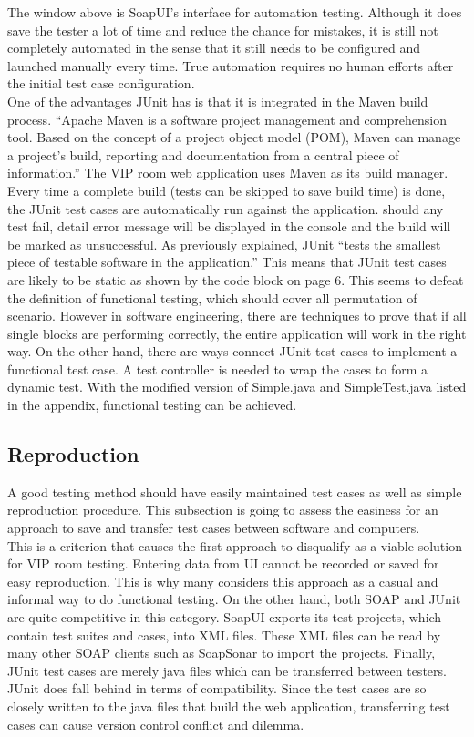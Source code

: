 \documentclass[12pt]{article}
\begin{document}
The window above is SoapUI's interface for automation testing. Although it does save the tester a lot of time and reduce the chance for mistakes, it is still not completely automated in the sense that it still needs to be configured and launched manually every time. True automation requires no human efforts after the initial test case configuration.\\

One of the advantages JUnit has is that it is integrated in the Maven build process. “Apache Maven is a software project management and comprehension tool. Based on the concept of a project object model (POM), Maven can manage a project's build, reporting and documentation from a central piece of information.”\cite{maven} The VIP room web application uses Maven as its build manager. Every time a complete build (tests can be skipped to save build time) is done, the JUnit test cases are automatically run against the application. should any test fail, detail error message will be displayed in the console and the build will be marked as unsuccessful. As previously explained, JUnit “tests the smallest piece of testable software in the application.”\cite{unit} This means that JUnit test cases are likely to be static as shown by the code block on page 6. This seems to defeat the definition of functional testing, which should cover all permutation of scenario. However in software engineering, there are techniques to prove that if all single blocks are performing correctly, the entire application will work in the right way. On the other hand, there are ways connect JUnit test cases to implement a functional test case. A test controller is needed to wrap the cases to form a dynamic test. With the modified version of Simple.java and SimpleTest.java listed in the appendix, functional testing can be achieved.\\


\subsection{Reproduction}
A good testing method should have easily maintained test cases as well as simple reproduction procedure. This subsection is going to assess the easiness for an approach to save and transfer test cases between software and computers.\\

This is a criterion that causes the first approach to disqualify as a viable solution for VIP room testing. Entering data from UI cannot be recorded or saved for easy reproduction. This is why many considers this approach as a casual and informal way to do functional testing. On the other hand, both SOAP and JUnit are quite competitive in this category. SoapUI exports its test projects, which contain test suites and cases, into XML files. These XML files can be read by many other SOAP clients such as SoapSonar to import the projects. Finally, JUnit test cases are merely java files which can be transferred between testers. JUnit does fall behind in terms of compatibility. Since the test cases are so closely written to the java files that build the web application, transferring test cases can cause version control conflict and dilemma.\\
\end{document}
